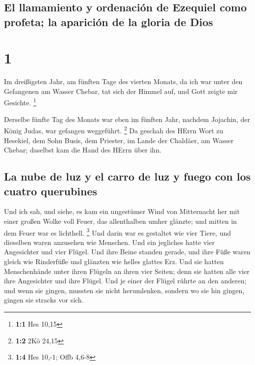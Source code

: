 \hypertarget{el-llamamiento-y-ordenaciuxf3n-de-ezequiel-como-profeta-la-apariciuxf3n-de-la-gloria-de-dios}{%
\subsection{El llamamiento y ordenación de Ezequiel como profeta; la
aparición de la gloria de
Dios}\label{el-llamamiento-y-ordenaciuxf3n-de-ezequiel-como-profeta-la-apariciuxf3n-de-la-gloria-de-dios}}

\hypertarget{section}{%
\section{1}\label{section}}

 Im dreißigsten Jahr, am fünften Tage des vierten Monats,
da ich war unter den Gefangenen am Wasser Chebar, tat sich der Himmel
auf, und Gott zeigte mir Gesichte. \footnote{\textbf{1:1} Hes 10,15}

 Derselbe fünfte Tag des Monats war eben im fünften Jahr,
nachdem Jojachin, der König Judas, war gefangen weggeführt. \footnote{\textbf{1:2}
  2Kö 24,15}  Da geschah des HErrn Wort zu Hesekiel, dem
Sohn Busis, dem Priester, im Lande der Chaldäer, am Wasser Chebar;
daselbst kam die Hand des HErrn über ihn.

\hypertarget{la-nube-de-luz-y-el-carro-de-luz-y-fuego-con-los-cuatro-querubines}{%
\subsection{La nube de luz y el carro de luz y fuego con los cuatro
querubines}\label{la-nube-de-luz-y-el-carro-de-luz-y-fuego-con-los-cuatro-querubines}}

 Und ich sah, und siehe, es kam ein ungestümer Wind von
Mitternacht her mit einer großen Wolke voll Feuer, das allenthalben
umher glänzte; und mitten in dem Feuer war es lichthell. \footnote{\textbf{1:4}
  Hes 10,-1; Offb 4,6-8}  Und darin war es gestaltet wie
vier Tiere, und dieselben waren anzusehen wie Menschen. 
Und ein jegliches hatte vier Angesichter und vier Flügel. 
Und ihre Beine standen gerade, und ihre Füße waren gleich wie Rinderfüße
und glänzten wie helles glattes Erz.  Und sie hatten
Menschenhände unter ihren Flügeln an ihren vier Seiten; denn sie hatten
alle vier ihre Angesichter und ihre Flügel.  Und je einer
der Flügel rührte an den anderen; und wenn sie gingen, mussten sie nicht
herumlenken, sondern wo sie hin gingen, gingen sie stracks vor sich.

